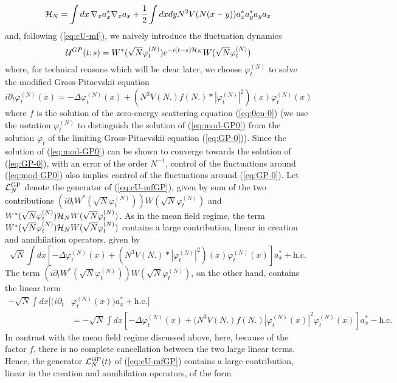 \documentclass[11pt,a4paper]{article}
\newcommand{\cU}{{\cal U}}
\newcommand{\cH}{{\cal H}}
\newcommand{\cL}{{\cal L}}
\begin{document}
\begin{equation}\label{eq:cHN} \cH_N = \int dx \, \nabla_x a_x^* \nabla_x a_x + \frac{1}{2} \int dx dy N^2 V(N (x-y)) a_x^* a_y^* a_y a_x \end{equation}
and, following (\ref{eq:cU-mf}), we naively introduce the fluctuation dynamics
\begin{equation}\label{eq:cU-mfGP} 
\cU^{GP} (t;s) = W^* (\sqrt{N} \varphi^{(N)}_t) e^{-i (t-s) \cH_N} W(\sqrt{N} \varphi^{(N)}_t) \end{equation}
where, for technical reasons which will be clear later, we choose $\varphi^{(N)}_t$ to solve the modified Gross-Pitaevskii equation 
\begin{equation}\label{eq:mod-GP0} i\partial_t \varphi^{(N)}_t (x) = -\Delta \varphi^{(N)}_t (x) + (N^3 V(N.) f(N.) * |\varphi^{(N)}_t|^2) (x) \varphi^{(N)}_t (x) \end{equation}
where $f$ is the solution of the zero-energy scattering equation (\ref{eq:0en-0}) (we use the notation $\varphi_t^{(N)}$ to distinguish the solution of (\ref{eq:mod-GP0}) from the solution $\varphi_t$ of the limiting Gross-Pitaevskii equation (\ref{eq:GP-0})). Since the solution of (\ref{eq:mod-GP0}) can be shown to converge towards the solution of (\ref{eq:GP-0}), with an error of the order $N^{-1}$, control of the fluctuations around (\ref{eq:mod-GP0}) also implies control of the fluctuations around (\ref{eq:GP-0}). Let $\cL_N^{\text{GP}}$ denote the generator of (\ref{eq:cU-mfGP}), given by sum of the two contributions $(i\partial_t W^* (\sqrt{N} \varphi^{(N)}_t)) W (\sqrt{N} \varphi^{(N)}_t)$ and $W^* (\sqrt{N} \varphi^{(N)}_t) \cH_N W (\sqrt{N} \varphi^{(N)}_t)$. As in the mean field regime, the term $W^*(\sqrt{N} \varphi^{(N)}_t) \cH_N W(\sqrt{N} \varphi^{(N)}_t)$ contains a large contribution, linear in creation and annihilation operators, given by
\[ \sqrt{N} \int dx \left[ -\Delta \varphi^{(N)}_t (x) + (N^3 V (N.) * |\varphi^{(N)}_t|^2) (x) \varphi^{(N)}_t (x) \right] a_x^* + \text{h.c.} \] 
The term $(i\partial_t W^* (\sqrt{N} \varphi^{(N)}_t)) W (\sqrt{N} \varphi^{(N)}_t)$, on the other hand, contains the linear term
\[ \begin{split} 
- \sqrt{N} \int dx \big[ (i\partial_t &\varphi^{(N)}_t (x)) a_x^* + \text{h.c.}\big]  \\
&=- \sqrt{N} \int dx \left[ -\Delta \varphi^{(N)}_t (x) + (N^3 V(N.) f(N.) |\varphi^{(N)}_t (x)|^2 \varphi^{(N)}_t (x) \right] a_x^* - \text{h.c.}
\end{split}\]
In contrast with the mean field regime discussed above, here, because of the factor $f$, there is no complete cancellation between the two large linear terms. Hence, the generator $\cL^{\text{GP}}_N (t)$ of (\ref{eq:cU-mfGP}) contains a large contribution, linear in the creation and annihilation operators, of the form
\end{document}
